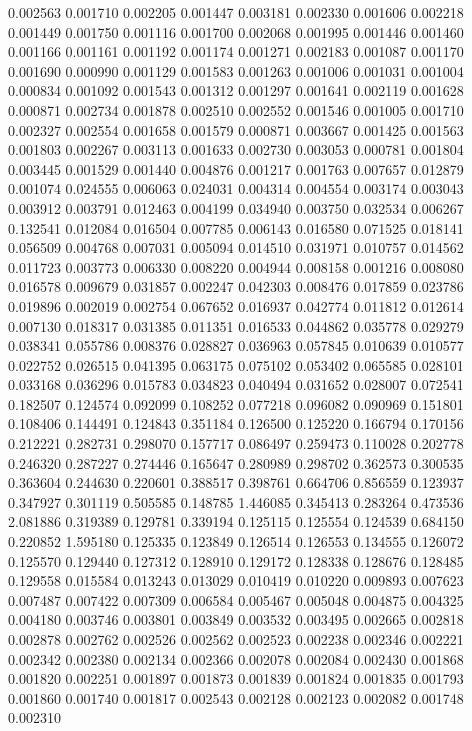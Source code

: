 0.002563
0.001710
0.002205
0.001447
0.003181
0.002330
0.001606
0.002218
0.001449
0.001750
0.001116
0.001700
0.002068
0.001995
0.001446
0.001460
0.001166
0.001161
0.001192
0.001174
0.001271
0.002183
0.001087
0.001170
0.001690
0.000990
0.001129
0.001583
0.001263
0.001006
0.001031
0.001004
0.000834
0.001092
0.001543
0.001312
0.001297
0.001641
0.002119
0.001628
0.000871
0.002734
0.001878
0.002510
0.002552
0.001546
0.001005
0.001710
0.002327
0.002554
0.001658
0.001579
0.000871
0.003667
0.001425
0.001563
0.001803
0.002267
0.003113
0.001633
0.002730
0.003053
0.000781
0.001804
0.003445
0.001529
0.001440
0.004876
0.001217
0.001763
0.007657
0.012879
0.001074
0.024555
0.006063
0.024031
0.004314
0.004554
0.003174
0.003043
0.003912
0.003791
0.012463
0.004199
0.034940
0.003750
0.032534
0.006267
0.132541
0.012084
0.016504
0.007785
0.006143
0.016580
0.071525
0.018141
0.056509
0.004768
0.007031
0.005094
0.014510
0.031971
0.010757
0.014562
0.011723
0.003773
0.006330
0.008220
0.004944
0.008158
0.001216
0.008080
0.016578
0.009679
0.031857
0.002247
0.042303
0.008476
0.017859
0.023786
0.019896
0.002019
0.002754
0.067652
0.016937
0.042774
0.011812
0.012614
0.007130
0.018317
0.031385
0.011351
0.016533
0.044862
0.035778
0.029279
0.038341
0.055786
0.008376
0.028827
0.036963
0.057845
0.010639
0.010577
0.022752
0.026515
0.041395
0.063175
0.075102
0.053402
0.065585
0.028101
0.033168
0.036296
0.015783
0.034823
0.040494
0.031652
0.028007
0.072541
0.182507
0.124574
0.092099
0.108252
0.077218
0.096082
0.090969
0.151801
0.108406
0.144491
0.124843
0.351184
0.126500
0.125220
0.166794
0.170156
0.212221
0.282731
0.298070
0.157717
0.086497
0.259473
0.110028
0.202778
0.246320
0.287227
0.274446
0.165647
0.280989
0.298702
0.362573
0.300535
0.363604
0.244630
0.220601
0.388517
0.398761
0.664706
0.856559
0.123937
0.347927
0.301119
0.505585
0.148785
1.446085
0.345413
0.283264
0.473536
2.081886
0.319389
0.129781
0.339194
0.125115
0.125554
0.124539
0.684150
0.220852
1.595180
0.125335
0.123849
0.126514
0.126553
0.134555
0.126072
0.125570
0.129440
0.127312
0.128910
0.129172
0.128338
0.128676
0.128485
0.129558
0.015584
0.013243
0.013029
0.010419
0.010220
0.009893
0.007623
0.007487
0.007422
0.007309
0.006584
0.005467
0.005048
0.004875
0.004325
0.004180
0.003746
0.003801
0.003849
0.003532
0.003495
0.002665
0.002818
0.002878
0.002762
0.002526
0.002562
0.002523
0.002238
0.002346
0.002221
0.002342
0.002380
0.002134
0.002366
0.002078
0.002084
0.002430
0.001868
0.001820
0.002251
0.001897
0.001873
0.001839
0.001824
0.001835
0.001793
0.001860
0.001740
0.001817
0.002543
0.002128
0.002123
0.002082
0.001748
0.002310
